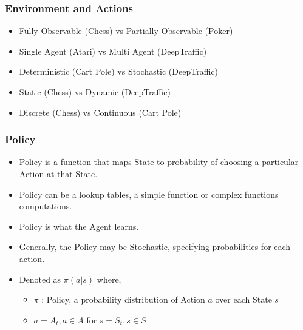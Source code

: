 \begin{frame}[fragile]\frametitle{Environment and Actions}

\begin{itemize}
\item Fully Observable (Chess) vs Partially Observable (Poker)
\item Single Agent (Atari) vs Multi Agent (DeepTraffic)
\item Deterministic (Cart Pole) vs Stochastic (DeepTraffic)
\item Static (Chess) vs Dynamic (DeepTraffic)
\item Discrete (Chess) vs Continuous (Cart Pole)

\end{itemize}

\end{frame}



\begin{frame}[fragile]\frametitle{Policy}

\begin{itemize}
\item Policy is a function that maps State to probability of choosing a particular Action at that State.
\item Policy can be a lookup tables, a simple function or complex functions computations.
\item Policy is what the Agent learns.
\item Generally, the Policy may be Stochastic, specifying probabilities for each action.
\item Denoted as $\pi (a|s)$ where,
	\begin{itemize}
	\item $\pi$ : Policy, a probability distribution of Action $a$ over each State $s$
	\item $a = A_t, a \in A$ for $s = S_t, s \in S$
	\end{itemize}

\end{itemize}

\end{frame}



